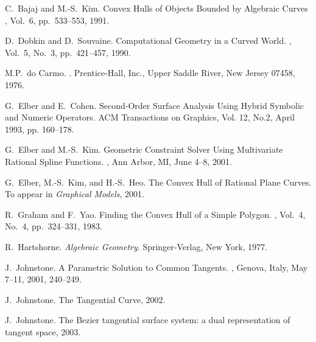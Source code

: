\documentclass{elsart}
\begin{document}
\begin{thebibliography}{}


C.~Bajaj and M.-S.~Kim.
\newblock Convex Hulls of Objects Bounded by Algebraic Curves
, Vol.~6, pp.~533--553, 1991.

D.~Dobkin and D.~Souvaine.
\newblock Computational Geometry in a Curved World.
, Vol.~5, No.~3, pp.~421--457, 1990.

M.P.~do Carmo.
.
\newblock Prentice-Hall, Inc., Upper Saddle River, New Jersey 07458, 1976.

G.~Elber and E.~Cohen.
\newblock Second-Order Surface Analysis Using Hybrid Symbolic and
Numeric Operators.
\newblock ACM Transactions on Graphics, Vol. 12, No.2, April 1993, 
pp. 160--178.

G.~Elber and M.-S.~Kim.
\newblock Geometric Constraint Solver
Using Multivariate Rational Spline Functions.
,
Ann Arbor, MI, June 4--8, 2001.

G.~Elber, M.-S.~Kim, and H.-S.~Heo.
\newblock The Convex Hull of Rational Plane Curves.
\newblock To appear in {\em Graphical Models\/}, 2001.

R.~Graham and F.~Yao.
\newblock Finding the Convex Hull of a Simple Polygon.
, Vol.~4, No.~4, pp.~324--331, 1983.

R.~Hartshorne.
{\em Algebraic Geometry}. Springer-Verlag, New York, 1977.

J.~Johnstone.
\newblock A Parametric Solution to Common Tangents.
,
Genova, Italy, May 7--11, 2001, 240--249.

J.~Johnstone.
The Tangential Curve, 2002.

J.~Johnstone.
The Bezier tangential surface system: a dual representation of tangent space,
2003.


\end{thebibliography}
\end{document}
